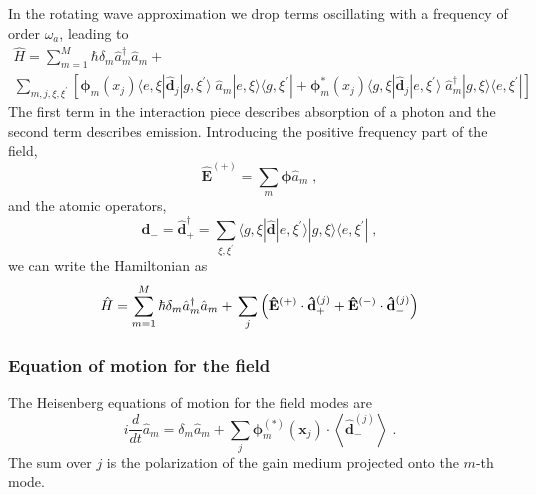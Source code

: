 \documentclass[aps, superscriptaddress, groupedaddress, preprint]{revtex4}
\renewcommand\vec{\mathbf}
\begin{document}
In the rotating wave approximation we drop terms oscillating with
a frequency of order $\omega_a$, leading to
\begin{multline}
  \hat H = 
  \sum_{m=1}^M \hbar\delta_m\hat a_m^\dagger\hat a_m +\\
  \sum_{m,j,\xi,\xi^\prime}
  \left[
    \vec{\phi}_m(x_j) 
    \langle e,\xi| \vec{\hat d}_j | g,\xi^\prime\rangle\;
    \hat a_m 
    | e,\xi \rangle \langle g,\xi^\prime| +
    \vec{\phi}_m^*(x_j) 
    \langle g,\xi| \vec{\hat d}_j | e,\xi^\prime\rangle\;
    \hat a_m^\dagger 
    | g,\xi \rangle \langle e,\xi^\prime|
  \right]
\end{multline}
The first term in the interaction piece describes absorption of a
photon and the second term describes emission.  Introducing the
positive frequency part of the field,
\begin{equation}
  \vec{\hat E}^{(+)}=\sum_m\vec{\phi}\hat a_m\;,
\end{equation}
and the atomic operators,
\begin{equation}
  \vec{\hat d}_-=\vec{\hat d}_+^\dagger =
  \sum_{\xi,\xi^\prime}
  \langle g,\xi|\vec{\hat d}| e,\xi^\prime \rangle
  | g,\xi\rangle \langle e,\xi^\prime |\;,
\end{equation}
we can write the Hamiltonian as
\begin{equation}
  \hat H = 
  \sum_{m=1}^M \hbar\delta_m\hat a_m^\dagger\hat a_m +\\
  \sum_j\left( 
    \vec{\hat E}^{(+)}\cdot \vec{\hat d}_+^{(j)} +
    \vec{\hat E}^{(-)}\cdot \vec{\hat d}_-^{(j)}
  \right)
\end{equation}


\subsubsection{Equation of motion for the field}

The Heisenberg equations of motion for the field modes are
\begin{equation}
  i\frac{d}{dt}\hat a_m =
  \delta_m\hat a_m +
  \sum_j \vec{\phi}_m^{(*)}(\vec{x}_j)\cdot
  \left< \vec{\hat d}_-^{(j)}\right>\;.
\end{equation}
The sum over $j$ is the polarization of the gain medium projected
onto the $m$-th mode.
\end{document}
